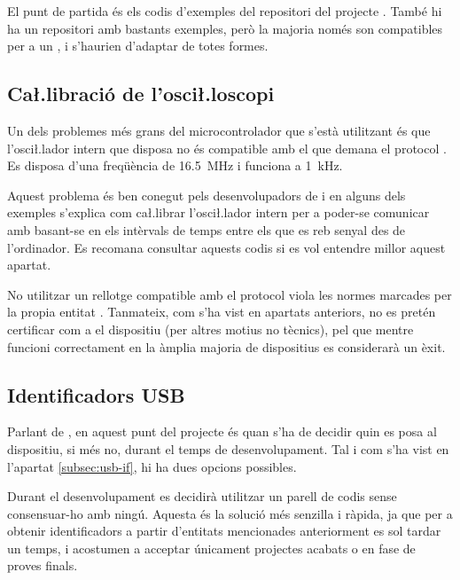 El punt de partida és els codis d'exemples del repositori del projecte
\cite{VusbProjects}.
També hi ha un repositori amb bastants exemples, però la majoria només son
compatibles per a un , i s'haurien d'adaptar de totes formes.

\subsection{Ca\l.libració de l'osci\l.loscopi}

Un dels problemes més grans del microcontrolador que s'està utilitzant és que
l'osci\l.lador intern que disposa no és compatible amb el que demana el
protocol . Es disposa d'una freqüència de
\SI[round-mode=places,round-precision=1]{16.5}{\mega\hertz} i
 funciona a
\SI[round-mode=places,round-precision=0]{1}{\kilo\hertz}.

Aquest problema és ben conegut pels desenvolupadors de  i en alguns
dels exemples s'explica com ca\l.librar l'osci\l.lador intern per a poder-se
comunicar amb  basant-se en els intèrvals de temps entre els que es
reb senyal des de l'ordinador. Es recomana consultar aquests codis
\cite{Vusb} si es vol entendre millor aquest apartat.

No utilitzar un rellotge compatible amb el protocol  viola les normes
marcades per la propia entitat . Tanmateix, com s'ha vist en
apartats anteriors, no es pretén certificar com a  el dispositiu
(per altres motius no tècnics), pel que mentre funcioni correctament en la
àmplia majoria de dispositius es considerarà un èxit.

\subsection{Identificadors USB}

Parlant de , en aquest punt del projecte és quan s'ha de decidir
quin  es posa al dispositiu, si més no, durant el temps de
desenvolupament. Tal i com s'ha vist en l'apartat \ref{subsec:usb-if}, hi ha dues
opcions possibles.

Durant el desenvolupament es decidirà utilitzar un parell de codis sense
consensuar-ho amb ningú. Aquesta és la solució més senzilla i ràpida, ja que per
a obtenir identificadors a partir d'entitats mencionades anteriorment es sol
tardar un temps, i acostumen a acceptar únicament projectes acabats o en fase
de proves finals.

